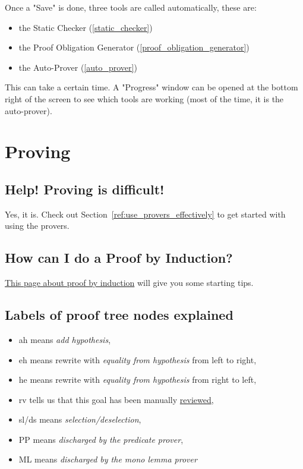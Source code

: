 Once a "Save" is done, three tools are called automatically, these are:

\begin{itemize}
	\item the Static Checker (\ref{static_checker})
	\item the Proof Obligation Generator (\ref{proof_obligation_generator})
	\item the Auto-Prover (\ref{auto_prover})
\end{itemize}

This can take a certain time. A "Progress" window can be opened at the bottom right of the screen to see which tools are working (most of the time, it is the auto-prover). 

\section{Proving}

\subsection{Help!  Proving is difficult!}

Yes, it is.  Check out Section~\ref{ref:use_provers_effectively} to get started with using the provers.


\subsection{How can I do a Proof by Induction?}

\href{http://wiki.event-b.org/index.php/Induction_proof}{This page about proof by induction} will give you some starting tips.

\subsection{Labels of proof tree nodes explained}

\begin{itemize}
	\item \textsf{ah} means \textit{add hypothesis},
	\item \textsf{eh} means rewrite with \textit{equality from hypothesis} from left to right,
	\item \textsf{he} means rewrite with \textit{equality from hypothesis} from right to left,
	\item \textsf{rv} tells us that this goal has been manually \href{http://wiki.event-b.org/index.php/The_Proving_Perspective_(Rodin_User_Manual)#The_Proof_Control_Window}{reviewed},
	\item \textsf{sl/ds} means \textit{selection/deselection},
	\item \textsf{PP} means \textit{discharged by the predicate prover},
	\item \textsf{ML} means \textit{discharged by the mono lemma prover}
\end{itemize}

